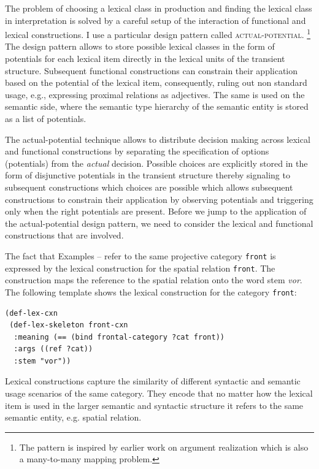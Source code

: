 The problem of choosing a lexical class in production and 
finding the lexical class in interpretation is solved by a careful
setup of the interaction of functional and lexical constructions.
I use a particular design pattern called \textsc{actual-potential}.%
\footnote{The pattern is inspired by earlier work on
argument realization \citep{vantrijp2008phd} which is 
also a many-to-many mapping problem.}
The design pattern allows to store possible lexical classes
in the form of potentials for each lexical item directly in the 
lexical units of the transient structure. Subsequent 
functional constructions can constrain their application based on the 
potential of the lexical item, consequently, ruling out 
non standard usage, e.g., expressing proximal relations as adjectives.
The same is used on the semantic side, where the semantic
type hierarchy of the semantic entity is stored as a list of potentials.

The actual-potential technique allows to 
distribute decision making across lexical and functional constructions 
by separating the specification of options (potentials)
from the \emph{actual} decision. Possible choices are
explicitly stored in the form of disjunctive potentials
in the transient structure 
thereby signaling to subsequent constructions which choices are 
possible which allows subsequent constructions to constrain their 
application by observing potentials and triggering only when
the right potentials are present. Before we jump to the 
application of the actual-potential design pattern, we need to 
consider the lexical and functional constructions that are involved.

The fact that Examples -- 
refer to the same projective category {\footnotesize\tt front} is expressed 
by the lexical construction for the spatial relation {\footnotesize\tt front}.
The construction maps the reference to the spatial relation onto 
the word stem \textit{vor}. The following template shows the lexical 
construction for the category {\footnotesize\tt front}:
\ea
\label{e:def-lex-front}
\begin{lstlisting}
(def-lex-cxn
 (def-lex-skeleton front-cxn 
  :meaning (== (bind frontal-category ?cat front)) 
  :args ((ref ?cat))
  :stem "vor"))
\end{lstlisting}
\z
Lexical constructions capture the similarity of different syntactic and
semantic usage scenarios of the same category. They encode
that no matter how the lexical item is used in the larger
semantic and syntactic structure it refers to the same
semantic entity, e.g. spatial relation.

